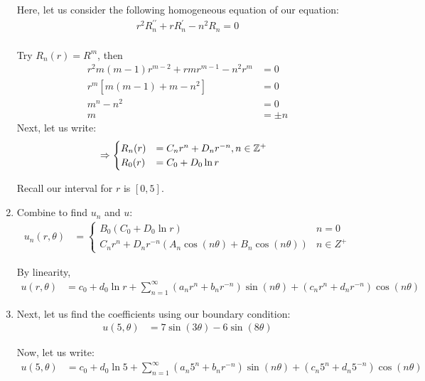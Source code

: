 \begin{enumerate}
  Here, let us consider the following homogeneous equation of our equation:
  \begin{align}
    r^2 R^{\prime\prime}_n + rR^\prime_n - n^2 R_n = 0\\
  \end{align}

  Try $R_n(r) = R^m$, then
  \begin{align}
    r^2 m( m - 1) r^{m - 2} + r mr^{m - 1} - n^2 r^m & = 0\\
    r^m \left[ m( m - 1) + m - n^2 \right] & = 0\\
    m^n - n^2 & = 0\\
    m & = \pm n
  \end{align}
  Next, let us write:
  \begin{align}
    & \Rightarrow
    \begin{cases}
      R_n(r) & = C_n r^n + D_n r^{-n}, n \in \mathbb Z^+\\
      R_0(r) & = C_0 + D_0 \ln r
    \end{cases}
  \end{align}

  Recall our interval for $r$ is $[0, 5]$.
  \item Combine to find $u_n$ and $u$:
  \begin{align}
    u_n(r, \theta) & =
    \begin{cases}
      B_0( C_0 + D_0 \ln r) & n = 0\\
      C_nr^n + D_n r^{-n}\left(A_n \cos(n \theta) + B_n \cos(n \theta) \right) & n \in Z^+
    \end{cases}
  \end{align}

  By linearity,
  \begin{align}
    u(r, \theta) & = c_0 + d_0 \ln r + \sum^\infty_{n = 1} (a_nr^n + b_nr^{-n}) \sin(n \theta) + (c_nr^n + d_nr^{-n}) \cos(n \theta)
  \end{align}

  \item Next, let us find the coefficients using our boundary condition:
  \begin{align}
    u(5, \theta) & = 7 \sin(3 \theta) - 6\sin(8 \theta)
  \end{align}

  Now, let us write:
  \begin{align}
    u(5, \theta) & = c_0 + d_0 \ln 5 + \sum^\infty_{n = 1} (a_n 5^n + b_n r^{-n}) \sin(n \theta) + (c_n 5^n + d_n 5^{-n}) \cos(n \theta)
  \end{align}


\end{enumerate}
